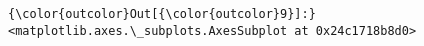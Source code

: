 \documentclass[11pt]{article}
\begin{document}
\begin{Verbatim}[commandchars=\\\{\}]
{\color{outcolor}Out[{\color{outcolor}9}]:} <matplotlib.axes.\_subplots.AxesSubplot at 0x24c1718b8d0>
\end{Verbatim}
            
    \begin{center}
    \end{center}
    { \hspace*{\fill} \\}
    

    
    
    
    
\end{document}
